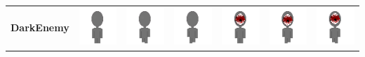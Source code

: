 \documentclass[../Main.tex]{subfiles}
\begin{document}
\begin{center}
\begin{tabular}{ | m{} | m{} m{} m{} m{} m{} m{} | }
                    \multirow{2}{*}{\textbf{DarkEnemy}} & \centerline{\includegraphics[scale=3]{../res/textures/entities/enemies/dark/North.png}} & \centerline{\includegraphics[scale=3]{../res/textures/entities/enemies/dark/North-Walk-1.png}} & \centerline{\includegraphics[scale=3]{../res/textures/entities/enemies/dark/North-Walk-2.png}} & \centerline{\includegraphics[scale=3]{../res/textures/entities/enemies/dark/South.png}} & \centerline{\includegraphics[scale=3]{../res/textures/entities/enemies/dark/South-Walk-1.png}} & \centerline{\includegraphics[scale=3]{../res/textures/entities/enemies/dark/South-Walk-2.png}} \\

\end{tabular}
\end{center}
\end{document}

